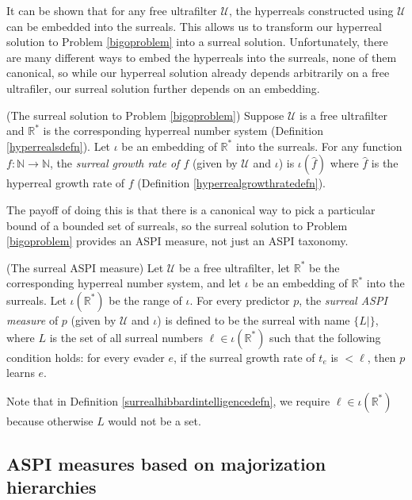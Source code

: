 \documentclass[twoside,11pt]{article}
\begin{document}
It can be shown that for any free ultrafilter $\mathcal U$, the hyperreals constructed using
$\mathcal U$ can be embedded into the surreals. This allows us to transform our hyperreal
solution to Problem \ref{bigoproblem} into a surreal solution.
Unfortunately, there are many different ways to embed the hyperreals into the surreals,
none of them canonical, so while our hyperreal solution already depends arbitrarily on
a free ultrafiler, our surreal solution further depends on an embedding.

\begin{definition}
    (The surreal solution to Problem \ref{bigoproblem})
    Suppose $\mathcal U$ is a free ultrafilter and $\mathbb R^*$ is the corresponding
    hyperreal number system (Definition \ref{hyperrealsdefn}).
    Let $\iota$ be an embedding of $\mathbb R^*$ into the surreals.
    For any function $f:\mathbb N\to\mathbb N$, the \emph{surreal growth rate
    of $f$} (given by $\mathcal U$ and $\iota$) is
    $\iota(\hat f)$ where $\hat f$ is the hyperreal growth
    rate of $f$ (Definition \ref{hyperrealgrowthratedefn}).
\end{definition}

The payoff of doing this is that there is a canonical way to pick a particular
bound of a bounded set of surreals, so the surreal solution to Problem \ref{bigoproblem}
provides an ASPI measure, not just an ASPI taxonomy.

\begin{definition}
\label{surrealhibbardintelligencedefn}
    (The surreal ASPI measure)
    Let $\mathcal U$ be a free ultrafilter, let $\mathbb R^*$ be the corresponding
    hyperreal number system, and let $\iota$ be an embedding of $\mathbb R^*$
    into the surreals. Let $\iota(\mathbb R^*)$ be the range of $\iota$.
    For every predictor $p$, the \emph{surreal ASPI measure} of $p$
    (given by $\mathcal U$ and $\iota$)
    is defined to be the surreal with name $\{L|\}$,
    where $L$ is the set of all surreal numbers $\ell\in\iota(\mathbb R^*)$ such that
    the following condition holds: for every evader $e$,
    if the surreal growth rate of $t_e$ is $<\ell$, then $p$ learns $e$.
\end{definition}

Note that in Definition \ref{surrealhibbardintelligencedefn}, we require
$\ell\in\iota(\mathbb R^*)$ because otherwise $L$ would not be a set.

\subsection{ASPI measures based on majorization hierarchies}
\end{document}
